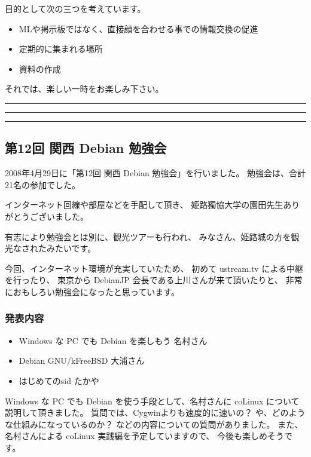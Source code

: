 \documentclass[mingoth,a4paper]{jsarticle}
\begin{document}
 目的として次の三つを考えています。
 \begin{itemize}
  \item MLや掲示板ではなく、直接顔を合わせる事での情報交換の促進
  \item 定期的に集まれる場所
  \item 資料の作成
 \end{itemize}

 それでは、楽しい一時をお楽しみ下さい。

\newpage

\begin{minipage}[b]{0.2\hsize}
 {}
\end{minipage}
\begin{minipage}[b]{0.8\hsize}
\hrule
\vspace{2mm}
\hrule
\setcounter{tocdepth}{1}
\tableofcontents
\vspace{2mm}
\hrule
\end{minipage}

\subsection{第12回 関西 Debian 勉強会}
2008年4月29日に「第12回 関西 Debian 勉強会」を行いました。
勉強会は、合計21名の参加でした。

インターネット回線や部屋などを手配して頂き、
姫路獨協大学の園田先生ありがとうございました。

有志により勉強会とは別に、観光ツアーも行われ、
みなさん、姫路城の方を観光なされたみたいです。

今回、インターネット環境が充実していたため、
初めて ustream.tv による中継を行ったり、
東京から DebianJP 会長である上川さんが来て頂いたりと、
非常におもしろい勉強会になったと思っています。

\subsubsection{発表内容}

\begin{itemize}
 \item Windows な PC でも Debian を楽しもう 名村さん
 \item Debian GNU/kFreeBSD 大浦さん
 \item はじめてのsid たかや
\end{itemize}

Windows な PC でも Debian を使う手段として、名村さんに
coLinux について説明して頂きました。
質問では、Cygwinよりも速度的に速いの？
や、どのような仕組みになっているのか？
などの内容についての質問がありました。
また、名村さんによる coLinux 実践編を予定していますので、
今後も楽しめそうです。
\end{document}
